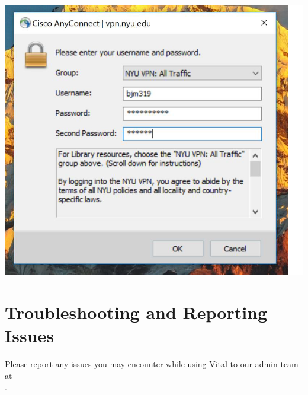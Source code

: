 \documentclass[12pt]{article}
\newcommand{\MYhref}[3][blue]{\href{#2}{\color{#1}{#3}}}%
\begin{document}
{%
\centering
\includegraphics[scale=0.5]{vpn2.png}

}
\fi

\section*{Troubleshooting and Reporting Issues}
Please report any issues you may encounter while using Vital to our admin team at \\ \MYhref{mailto:vital@nyu.edu}{vital@nyu.edu}.

 
\end{document}
